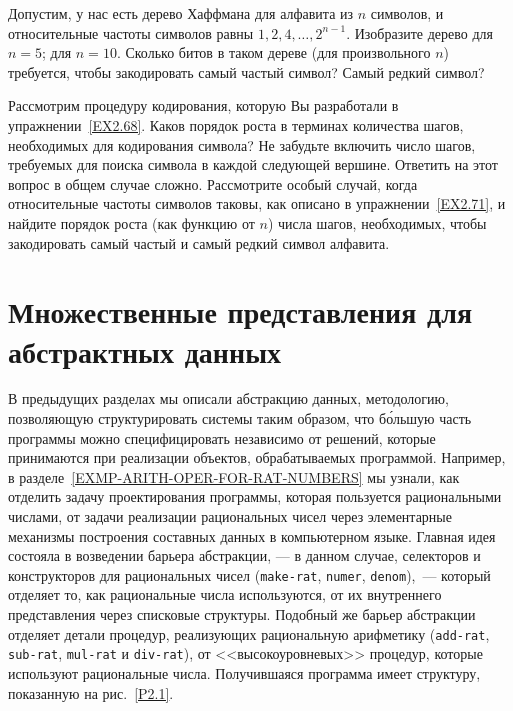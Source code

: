 \begin{exercise}{2.71}\label{EX2.71}%
Допустим, у нас есть дерево Хаффмана для алфавита из
$n$ символов, и относительные частоты символов равны
$1, 2, 4, \ldots, 2^{n-1}$.  Изобразите дерево для $n
= 5$; для $n = 10$.  Сколько битов в таком дереве
(для произвольного $n$) требуется, чтобы закодировать самый 
частый символ? Самый редкий символ?
\end{exercise}
\begin{exercise}{2.72}\label{EX2.72}%
Рассмотрим процедуру кодирования, которую Вы разработали
в упражнении~\ref{EX2.68}.  Каков порядок роста в терминах
количества шагов, необходимых для кодирования символа?  Не забудьте
включить число шагов, требуемых для поиска символа в каждой следующей
вершине.  Ответить на этот вопрос в общем случае сложно.  Рассмотрите
особый случай, когда относительные частоты символов таковы, как
описано в упражнении~\ref{EX2.71}, и найдите порядок роста
(как функцию от $n$) числа шагов, необходимых, чтобы
закодировать самый частый и самый редкий символ алфавита.
\end{exercise}


\section{Множественные представления для абстракт\-ных данных}
\label{MULTIPLE-REPRESENTATIONS-FOR-ABSTRACT-DATA}%

В предыдущих разделах мы описали абстракцию данных, методологию,
позволяющую структурировать системы таким образом, что б\'{о}льшую часть
программы можно специфицировать независимо от решений, которые принимаются 
при реализации объектов, обрабатываемых программой.  Например, в 
разделе~\ref{EXMP-ARITH-OPER-FOR-RAT-NUMBERS}
мы узнали, как отделить задачу проектирования программы, которая
пользуется рациональными числами, от задачи реализации рациональных
чисел через элементарные механизмы построения составных данных в 
компьютерном языке.  Главная идея состояла в возведении барьера
абстракции, 
--- в данном случае, селекторов и конструкторов для
рациональных чисел ({\tt make-rat}, {\tt numer},
{\tt denom}),~--- который отделяет то, как рациональные числа
используются, от их внутреннего представления через списковые
структуры.  Подобный же барьер абстракции отделяет детали процедур,
реализующих рациональную арифметику ({\tt add-rat},
{\tt sub-rat}, {\tt mul-rat} и {\tt div-rat}), от
<<высокоуровневых>> процедур, которые используют рациональные числа.
Получившаяся программа имеет структуру, показанную на рис.~\ref{P2.1}.

